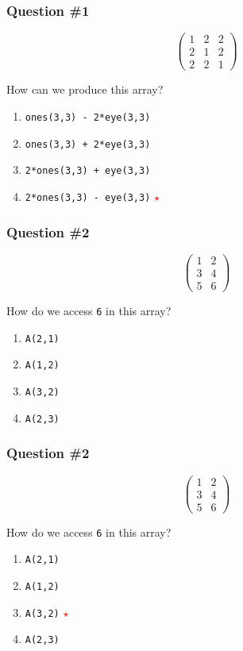 \documentclass[11pt]{beamer}
\newcommand{\correctstar}{{\Large\textcolor{red}{$\star$}}}
\begin{document}
\begin{frame}[fragile]
  \frametitle{Question \#1}
  \Enlarge
$$
\left(
\begin{array}{ccc}
1 & 2 & 2 \\
2 & 1 & 2 \\
2 & 2 & 1
\end{array}
\right)
$$

How can we produce this array?

  \begin{enumerate}[label=\Alph*]
    \item  \texttt{ones(3,3) - 2*eye(3,3)}
    \item  \texttt{ones(3,3) + 2*eye(3,3)}
    \item  \texttt{2*ones(3,3) + eye(3,3)}
    \item  \texttt{2*ones(3,3) - eye(3,3)}  \correctstar
  \end{enumerate}
\end{frame}

\begin{frame}[fragile]
  \frametitle{Question \#2}
  \Enlarge
$$
\left(
\begin{array}{cc}
1 & 2 \\
3 & 4 \\
5 & 6
\end{array}
\right)
$$

How do we access \texttt{6} in this array?

  \begin{enumerate}[label=\Alph*]
    \item  \texttt{A(2,1)}
    \item  \texttt{A(1,2)}
    \item  \texttt{A(3,2)}
    \item  \texttt{A(2,3)}
  \end{enumerate}
\end{frame}

\begin{frame}[fragile]
  \frametitle{Question \#2}
  \Enlarge
$$
\left(
\begin{array}{cc}
1 & 2 \\
3 & 4 \\
5 & 6
\end{array}
\right)
$$

How do we access \texttt{6} in this array?

  \begin{enumerate}[label=\Alph*]
    \item  \texttt{A(2,1)}
    \item  \texttt{A(1,2)}
    \item  \texttt{A(3,2)}  \correctstar
    \item  \texttt{A(2,3)}
  \end{enumerate}
\end{frame}
\end{document}
